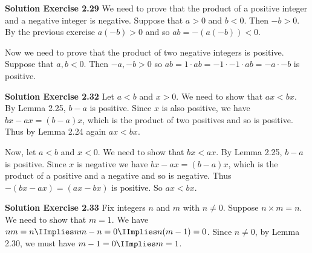 \documentclass[oneside,12pt]{amsart}
\begin{document}
\bigskip


\textbf{Solution Exercise 2.29} We need to prove that the product of a
positive integer and a  negative integer is negative. Suppose that $a>0$
and $b<0$. Then $-b>0$. By the previous exercise $a(-b) > 0$ and so
$ab = -(a(-b)) < 0$.

Now we need to prove that the product of two negative integers is positive.
Suppose that $a,b<0$. Then $-a,-b > 0$ so $ab = 1\cdot ab = -1\cdot-1\cdot ab
=-a\cdot-b$ is positive.

\bigskip


\textbf{Solution Exercise 2.32} Let $a<b$ and $x>0$. We need to show
that $ax < bx$. By Lemma 2.25, $b-a$ is positive.
Since $x$ is also positive, we have $bx - ax = (b-a)x$,
which is the product of two positives and so is
positive. Thus by Lemma 2.24 again $ax < bx$.

Now, let $a<b$ and $x<0$. We need to show that $bx < ax$. By Lemma 2.25,
$b-a$ is positive. Since $x$ is negative we have $bx - ax = (b-a)x$, which
is the product of a positive and a negative and so is negative. Thus
$-(bx - ax) = (ax -bx)$ is positive. So $ax < bx$.

\bigskip


\textbf{Solution Exercise 2.33} Fix integers $n$ and $m$ with $n\not=0$.
Suppose $n\times m=n$. We need to show that $m=1$. We have
$nm=n\IImplies nm-n=0 \IImplies n(m-1) = 0$. Since $n\not=0$, by Lemma 2.30,
we must have $m-1=0\IImplies m=1$.
\end{document}
